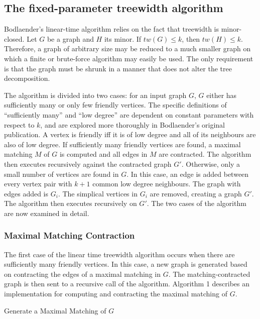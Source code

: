 \documentclass[12pt,conference]{IEEEtran}
\theoremstyle{plain}
\begin{document}
\subsection{The fixed-parameter treewidth algorithm}

Bodlaender's linear-time algorithm relies on the fact that treewidth is minor-closed. Let $G$ be a graph and $H$ its minor. If $tw(G) \leq k$, then $tw(H) \leq k$. Therefore, a graph of arbitrary size may be reduced to a much smaller graph on which a finite or brute-force algorithm may easily be used. The only requirement is that the graph must be shrunk in a manner that does not alter the tree decomposition. 

The algorithm is divided into two cases: for an input graph $G$, $G$ either has sufficiently many or only few friendly vertices. The specific definitions of ``sufficiently many'' and ``low degree'' are dependent on constant parameters with respect to $k$, and are explored more thoroughly in Bodlaender's original publication. A vertex is friendly iff it is of low degree and all of its neighbours are also of low degree. If sufficiently many friendly vertices are found, a maximal matching $M$ of $G$ is computed and all edges in $M$ are contracted. The algorithm then executes recursively against the contracted graph $G'$. Otherwise, only a small number of vertices are found in $G$. In this case, an edge is added between every vertex pair with $k+1$ common low degree neighbours. The graph with edges added is $G_{i}$. The simplical vertices in $G_{i}$ are removed, creating a graph $G'$. The algorithm then executes recursively on $G'$. The two cases of the algorithm are now examined in detail.

\subsubsection{Maximal Matching Contraction}

The first case of the linear time treewidth algorithm occurs when there are sufficiently many friendly vertices. In this case, a new graph is generated based on contracting the edges of a maximal matching in $G$. The matching-contracted graph is then sent to a recursive call of the algorithm. Algorithm 1 describes an implementation for computing and contracting the maximal matching of $G$.

\begin{algorithm}
  \caption{Generate a Maximal Matching of $G$}
  \label{maximal_matching}
  \begin{algorithmic}[1]
          \EndIf
        \EndFor
      \EndIf
    \EndFor
  \EndProcedure
  \end{algorithmic}
\end{algorithm}
\end{document}
